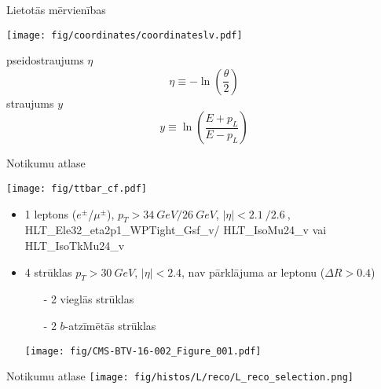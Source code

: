 \documentclass{beamer}
\begin{document}
\begin{frame}{Lietotās mērvienības}
  \centering
  \begin{minipage}{0.55\textwidth}
    \texttt{[image: fig/coordinates/coordinateslv.pdf]}
  \end{minipage}%
  \hspace{0.5cm}%
  \begin{minipage}{0.35\textwidth}
    pseidostraujums $\eta$
    \begin{equation*}
      \eta\equiv-\ln\left(\frac{\theta}{2}\right)
    \end{equation*}
    straujums $y$
    \begin{equation*}
      y\equiv\ln\left(\frac{E+p_{L}}{E-p_{L}}\right)
    \end{equation*}
  \end{minipage}
\end{frame}

\begin{frame}{Notikumu atlase}
  \def\twidth{0.3}
  \begin{minipage}{\twidth\paperwidth}
    \texttt{[image: fig/ttbar\_cf.pdf]}
    \label{fig:top_quark_production}
  \end{minipage}%
  \begin{minipage}{0.6\paperwidth}
    \begin{itemize}
    \item 1 leptons ($e^{\pm}$/$\mu^{\pm}$), \scriptsize$p_{T}> \SI{34}{GeV}/\SI{26}{GeV}$, $\left|\eta\right| < \SI{2.1}{}/\SI{2.6}{}$, HLT\_Ele32\_eta2p1\_WPTight\_Gsf\_v/ HLT\_IsoMu24\_v vai HLT\_IsoTkMu24\_v \normalsize
    \item 4 strūklas \scriptsize $p_{T}>\SI{30}{GeV}$, $\left|\eta\right|<2.4$, nav pārklājuma ar leptonu ($\Delta R>0.4$)\normalsize
      \begin{itemize}
      \item[-] 2 vieglās strūklas
      \item[-] 2 $b$-atzīmētās strūklas
      \end{itemize}
      \vspace{0.5cm}
      \centering
      \texttt{[image: fig/CMS-BTV-16-002\_Figure\_001.pdf]}
    \end{itemize}
  \end{minipage}
\end{frame}

\begin{frame}{Notikumu atlase}
  \centering
  \texttt{[image: fig/histos/L/reco/L\_reco\_selection.png]}
\end{frame}
\end{document}

